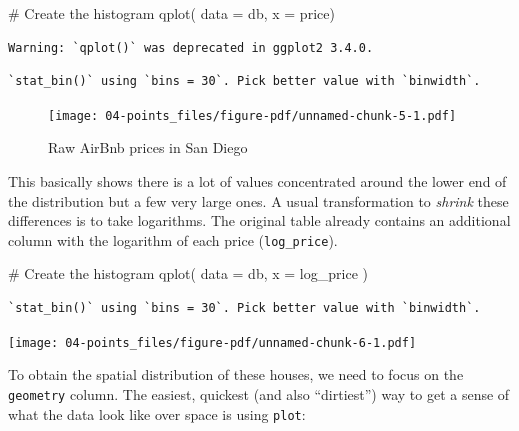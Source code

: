\documentclass[
  letterpaper,
  DIV=11,
  numbers=noendperiod,
  oneside]{scrreprt}
\newenvironment{Shaded}{\begin{snugshade}}{\end{snugshade}}
\newcommand{\AttributeTok}[1]{\textcolor[rgb]{0.40,0.45,0.13}{#1}}
\newcommand{\CommentTok}[1]{\textcolor[rgb]{0.37,0.37,0.37}{#1}}
\newcommand{\FunctionTok}[1]{\textcolor[rgb]{0.28,0.35,0.67}{#1}}
\newcommand{\NormalTok}[1]{\textcolor[rgb]{0.00,0.23,0.31}{#1}}
\begin{document}
\begin{Shaded}
\begin{Highlighting}[]
\CommentTok{\# Create the histogram}
\FunctionTok{qplot}\NormalTok{( }\AttributeTok{data =}\NormalTok{ db, }\AttributeTok{x =}\NormalTok{ price)}
\end{Highlighting}
\end{Shaded}

\begin{verbatim}
Warning: `qplot()` was deprecated in ggplot2 3.4.0.
\end{verbatim}

\begin{verbatim}
`stat_bin()` using `bins = 30`. Pick better value with `binwidth`.
\end{verbatim}

\begin{figure}[H]

{\centering \texttt{[image: 04-points\_files/figure-pdf/unnamed-chunk-5-1.pdf]}

}

\caption{Raw AirBnb prices in San Diego}

\end{figure}%

This basically shows there is a lot of values concentrated around the
lower end of the distribution but a few very large ones. A usual
transformation to \emph{shrink} these differences is to take logarithms.
The original table already contains an additional column with the
logarithm of each price (\texttt{log\_price}).

\begin{Shaded}
\begin{Highlighting}[]
\CommentTok{\# Create the histogram}
\FunctionTok{qplot}\NormalTok{( }\AttributeTok{data =}\NormalTok{ db, }\AttributeTok{x =}\NormalTok{ log\_price )}
\end{Highlighting}
\end{Shaded}

\begin{verbatim}
`stat_bin()` using `bins = 30`. Pick better value with `binwidth`.
\end{verbatim}

\texttt{[image: 04-points\_files/figure-pdf/unnamed-chunk-6-1.pdf]}

To obtain the spatial distribution of these houses, we need to focus on
the \texttt{geometry} column. The easiest, quickest (and also
``dirtiest'') way to get a sense of what the data look like over space
is using \texttt{plot}:
\end{document}
